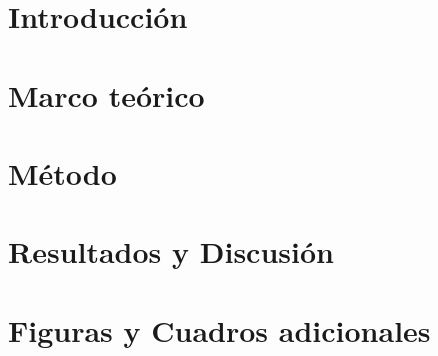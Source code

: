 \documentclass[12pt,letterpaper,spanish, twoside]{book}
\title{}
\author{Omar Pi\~na Ram\'irez}
\begin{document}
 

\chapter{Introducción}
  

\chapter{Marco teórico}
%

\chapter{Método}
%

\chapter{Resultados y Discusión}
%

\appendix
\chapter{Figuras y Cuadros adicionales}
%

\newpage
\printbibliography
%
\end{document}
